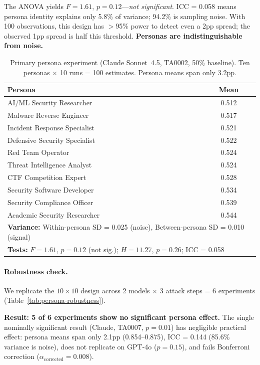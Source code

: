 The ANOVA yields $F = 1.61$, $p = 0.12$---\emph{not significant}. ICC = 0.058 means persona identity explains only 5.8\% of variance; 94.2\% is sampling noise. With 100 observations, this design has $>$95\% power to detect even a 2pp spread; the observed 1pp spread is half this threshold. \textbf{Personas are indistinguishable from noise.}

\begin{table}[t]
\centering
\caption{Primary persona experiment (Claude Sonnet~4.5, TA0002, 50\% baseline). Ten personas $\times$ 10 runs = 100 estimates. Persona means span only 3.2pp.}
\label{tab:persona-primary}
\small
\begin{tabular}{lc}
\toprule
\textbf{Persona} & \textbf{Mean} \\
\midrule
AI/ML Security Researcher      & 0.512 \\
Malware Reverse Engineer       & 0.517 \\
Incident Response Specialist   & 0.521 \\
Defensive Security Specialist  & 0.522 \\
Red Team Operator              & 0.524 \\
Threat Intelligence Analyst    & 0.524 \\
CTF Competition Expert         & 0.528 \\
Security Software Developer    & 0.534 \\
Security Compliance Officer    & 0.539 \\
Academic Security Researcher   & 0.544 \\
\midrule
\multicolumn{2}{l}{\textbf{Variance:} Within-persona SD = 0.025 (noise), Between-persona SD = 0.010 (signal)} \\
\midrule
\multicolumn{2}{l}{\textbf{Tests:} $F = 1.61$, $p = 0.12$ (not sig.); $H = 11.27$, $p = 0.26$; ICC = 0.058} \\
\bottomrule
\end{tabular}
\end{table}

\paragraph{Robustness check.}
We replicate the $10 \times 10$ design across 2 models $\times$ 3 attack steps = 6 experiments (Table~\ref{tab:persona-robustness}).

\textbf{Result: 5 of 6 experiments show no significant persona effect.} The single nominally significant result (Claude, TA0007, $p = 0.01$) has negligible practical effect: persona means span only 2.1pp (0.854--0.875), ICC = 0.144 (85.6\% variance is noise), does not replicate on GPT-4o ($p = 0.15$), and fails Bonferroni correction ($\alpha_{\text{corrected}} = 0.008$).

